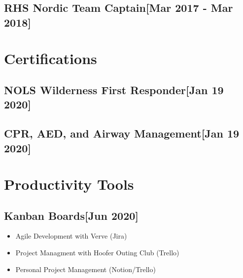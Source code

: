 \documentclass{article}
\begin{document}
    \subsection{\textbf{RHS Nordic Team Captain}\hfill[Mar 2017 - Mar 2018]}

\section{Certifications}

    \subsection{\textbf{NOLS Wilderness First Responder}\hfill[Jan 19 2020]}

    \subsection{\textbf{CPR, AED, and Airway Management}\hfill[Jan 19 2020]}

\section{Productivity Tools}

    \subsection{\textbf{Kanban Boards}\hfill{[Jun 2020]}}
        \begin{itemize}
            \item Agile Development with Verve (Jira)
            \item Project Managment with Hoofer Outing Club (Trello)
            \item Personal Project Management (Notion/Trello)
        \end{itemize}
\end{document}
